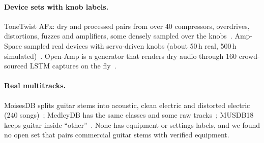 \paragraph{Device sets with knob labels.} ToneTwist AFx: dry and processed pairs
from over 40 compressors, overdrives, distortions, fuzzes and amplifiers, some
densely sampled over the knobs~\cite{comunita2025differentiable}. Amp-Space
sampled real devices with servo-driven knobs (about 50\,h real, 500\,h
simulated)~\cite{naradowsky2021ampspace}. Open-Amp is a generator that renders
dry audio through 160 crowd-sourced LSTM captures on the fly~\cite{wright2025openamp}.

\paragraph{Real multitracks.} MoisesDB splits guitar stems into acoustic, clean
electric and distorted electric (240 songs)~\cite{pereira2023moisesdb};
MedleyDB has the same classes and some raw tracks~\cite{bittner2014medleydb};
MUSDB18 keeps guitar inside ``other''~\cite{rafii2017musdb18}. None has
equipment or settings labels, and we found no open set that pairs commercial
guitar stems with verified equipment.

